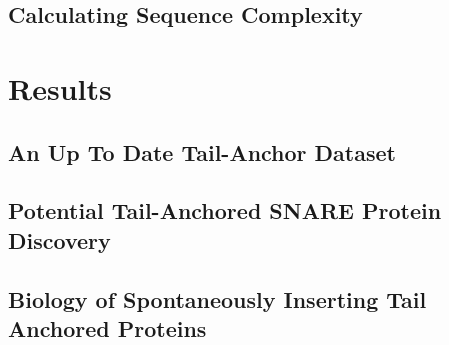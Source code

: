\subsection{Calculating Sequence Complexity}

\section{Results}

\subsection{An Up To Date Tail-Anchor Dataset}

\subsection{Potential Tail-Anchored SNARE Protein Discovery}

\subsection{Biology of Spontaneously Inserting Tail Anchored Proteins}
